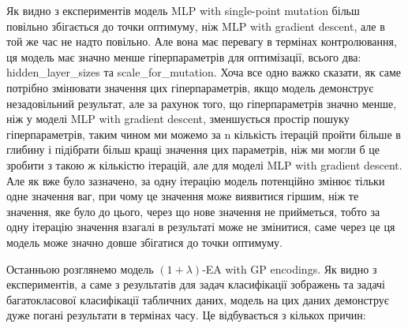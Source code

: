 Як видно з експериментів модель MLP with single-point mutation більш повільно збігається до точки оптимуму, ніж MLP with gradient descent, але в той же час не надто повільно. Але вона має перевагу в термінах контролювання, ця модель має значно менше гіперпараметрів для оптимізації, всього два: hidden\_layer\_sizes та scale\_for\_mutation. Хоча все одно важко сказати, як саме потрібно змінювати значення цих гіперпараметрів, якщо модель демонструє незадовільний результат, але за рахунок того, що гіперпараметрів значно менше, ніж у моделі MLP with gradient descent, зменшується простір пошуку гіперпараметрів, таким чином ми можемо за n кількість ітерацій пройти більше в глибину і підібрати більш кращі значення цих параметрів, ніж ми могли б це зробити з такою ж кількістю ітерацій, але для моделі MLP with gradient descent. Але як вже було зазначено, за одну ітерацію модель потенційно змінює тільки одне значення ваг, при чому це значення може виявитися гіршим, ніж те значення, яке було до цього, через що нове значення не прийметься, тобто за одну ітерацію значення взагалі в результаті може не змінитися, саме через це ця модель може значно довше збігатися до точки оптимуму.

Останньою розглянемо модель $(1+\lambda)$-EA with GP encodings. Як видно з експериментів, а саме з результатів для задач класифікації зображень та задачі багатокласової класифікації табличних даних, модель на цих даних демонструє дуже погані результати в термінах часу. Це відбувається з кількох причин: 

